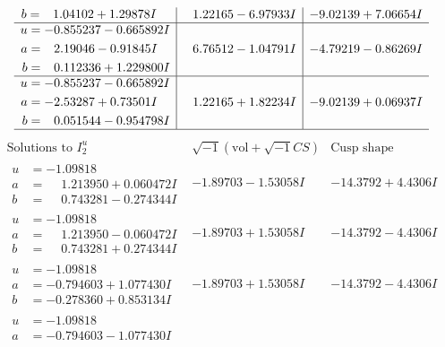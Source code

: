 \documentclass[1p]{elsarticle_modified}
\theoremstyle{definition}
\newcommand{\I}{\sqrt{-1}}
\begin{document}
$$\begin{array}{c|c|c}
\begin{aligned}
b &= \phantom{-}1.04102 + 1.29878 I\end{aligned}
 & \phantom{-}1.22165 - 6.97933 I & -9.02139 + 7.06654 I \\ \hline\begin{aligned}
u &= -0.855237 - 0.665892 I \\
a &= \phantom{-}2.19046 - 0.91845 I \\
b &= \phantom{-}0.112336 + 1.229800 I\end{aligned}
 & \phantom{-}6.76512 - 1.04791 I & -4.79219 - 0.86269 I \\ \hline\begin{aligned}
u &= -0.855237 - 0.665892 I \\
a &= -2.53287 + 0.73501 I \\
b &= \phantom{-}0.051544 - 0.954798 I\end{aligned}
 & \phantom{-}1.22165 + 1.82234 I & -9.02139 + 0.06937 I\\
 \hline 
 \end{array}$$\newpage$$\begin{array}{c|c|c}  
\text{Solutions to }I^u_{2}& \I (\text{vol} + \sqrt{-1}CS) & \text{Cusp shape}\\
 \hline 
\begin{aligned}
u &= -1.09818\phantom{ +0.000000I} \\
a &= \phantom{-}1.213950 + 0.060472 I \\
b &= \phantom{-}0.743281 - 0.274344 I\end{aligned}
 & -1.89703 - 1.53058 I & -14.3792 + 4.4306 I \\ \hline\begin{aligned}
u &= -1.09818\phantom{ +0.000000I} \\
a &= \phantom{-}1.213950 - 0.060472 I \\
b &= \phantom{-}0.743281 + 0.274344 I\end{aligned}
 & -1.89703 + 1.53058 I & -14.3792 - 4.4306 I \\ \hline\begin{aligned}
u &= -1.09818\phantom{ +0.000000I} \\
a &= -0.794603 + 1.077430 I \\
b &= -0.278360 + 0.853134 I\end{aligned}
 & -1.89703 + 1.53058 I & -14.3792 - 4.4306 I \\ \hline\begin{aligned}
u &= -1.09818\phantom{ +0.000000I} \\
a &= -0.794603 - 1.077430 I \\

\end{aligned}
\end{array}$$
\end{document}
